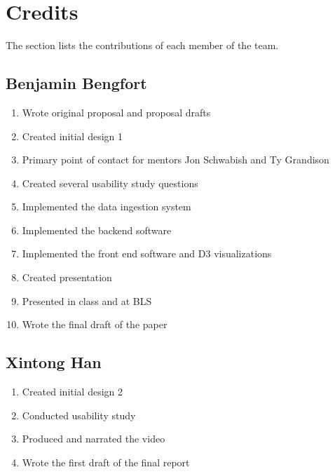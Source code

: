 \documentclass{sigchi}
\begin{document}
\balance{}




\newpage{}

\balance{}

\section{Credits}

The section lists the contributions of each member of the team.

\subsection{Benjamin Bengfort}

\begin{enumerate}
    \item Wrote original proposal and proposal drafts
    \item Created initial design 1
    \item Primary point of contact for mentors Jon Schwabish and Ty Grandison
    \item Created several usability study questions
    \item Implemented the data ingestion system
    \item Implemented the backend software
    \item Implemented the front end software and D3 visualizations
    \item Created presentation
    \item Presented in class and at BLS
    \item Wrote the final draft of the paper
\end{enumerate}

\subsection{Xintong Han}

\begin{enumerate}
    \item Created initial design 2
    \item Conducted usability study
    \item Produced and narrated the video
    \item Wrote the first draft of the final report
\end{enumerate}
\end{document}
